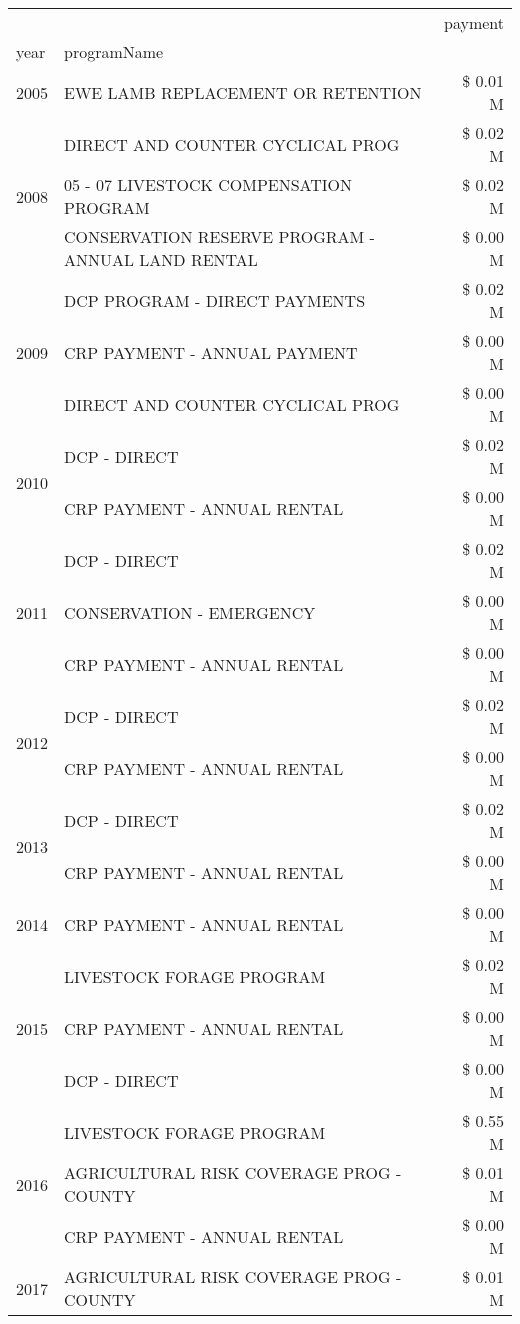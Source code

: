 \begin{tabular}{llr}
\toprule
 &  & payment \\
year & programName &  \\
\midrule
2005 & EWE LAMB REPLACEMENT OR RETENTION & \$ 0.01 M \\
\cline{1-3}
\multirow[t]{3}{*}{2008} & DIRECT AND COUNTER CYCLICAL PROG & \$ 0.02 M \\
 & 05 - 07 LIVESTOCK COMPENSATION PROGRAM & \$ 0.02 M \\
 & CONSERVATION RESERVE PROGRAM - ANNUAL LAND RENTAL & \$ 0.00 M \\
\cline{1-3}
\multirow[t]{3}{*}{2009} & DCP PROGRAM - DIRECT PAYMENTS & \$ 0.02 M \\
 & CRP PAYMENT - ANNUAL PAYMENT & \$ 0.00 M \\
 & DIRECT AND COUNTER CYCLICAL PROG & \$ 0.00 M \\
\cline{1-3}
\multirow[t]{2}{*}{2010} & DCP - DIRECT & \$ 0.02 M \\
 & CRP PAYMENT - ANNUAL RENTAL & \$ 0.00 M \\
\cline{1-3}
\multirow[t]{3}{*}{2011} & DCP - DIRECT & \$ 0.02 M \\
 & CONSERVATION - EMERGENCY & \$ 0.00 M \\
 & CRP PAYMENT - ANNUAL RENTAL & \$ 0.00 M \\
\cline{1-3}
\multirow[t]{2}{*}{2012} & DCP - DIRECT & \$ 0.02 M \\
 & CRP PAYMENT - ANNUAL RENTAL & \$ 0.00 M \\
\cline{1-3}
\multirow[t]{2}{*}{2013} & DCP - DIRECT & \$ 0.02 M \\
 & CRP PAYMENT - ANNUAL RENTAL & \$ 0.00 M \\
\cline{1-3}
2014 & CRP PAYMENT - ANNUAL RENTAL & \$ 0.00 M \\
\cline{1-3}
\multirow[t]{3}{*}{2015} & LIVESTOCK FORAGE PROGRAM & \$ 0.02 M \\
 & CRP PAYMENT - ANNUAL RENTAL & \$ 0.00 M \\
 & DCP - DIRECT & \$ 0.00 M \\
\cline{1-3}
\multirow[t]{3}{*}{2016} & LIVESTOCK FORAGE PROGRAM & \$ 0.55 M \\
 & AGRICULTURAL RISK COVERAGE PROG - COUNTY & \$ 0.01 M \\
 & CRP PAYMENT - ANNUAL RENTAL & \$ 0.00 M \\
\cline{1-3}
\multirow[t]{3}{*}{2017} & AGRICULTURAL RISK COVERAGE PROG - COUNTY & \$ 0.01 M \\

\end{tabular}
